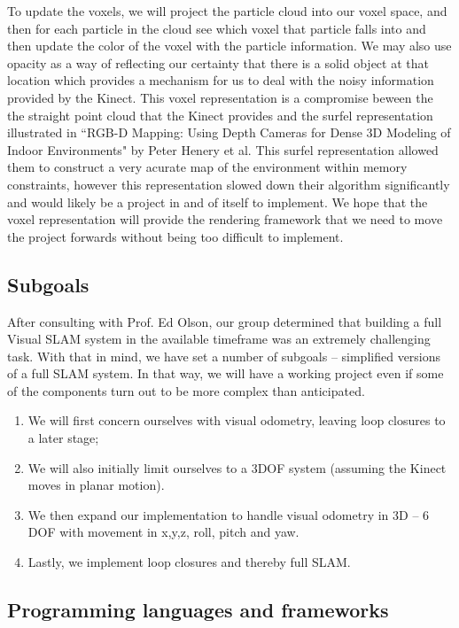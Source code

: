 \documentclass[12pt]{article}
\begin{document}
To update the voxels, we will project the particle cloud into our voxel space, and then for each particle in the cloud see which voxel that particle falls into and then update the color of the voxel with the particle information.  We may also use opacity as a way of reflecting our certainty that there is a solid object at that location which provides a mechanism for us to deal with the noisy information provided by the Kinect.  This voxel representation is a compromise beween the the straight point cloud that the Kinect provides and the surfel representation illustrated in ``RGB-D Mapping: Using Depth Cameras for Dense 3D Modeling of Indoor Environments" by Peter Henery et al. This surfel representation allowed them to construct a very acurate map of the environment within memory constraints, however this representation slowed down their algorithm significantly and would likely be a project in and of itself to implement.  We hope that the voxel representation will provide the rendering framework that we need to move the project forwards without being too difficult to implement.

\subsection{Subgoals}

After consulting with Prof. Ed Olson, our group determined that building a full Visual SLAM system in the available timeframe was an extremely challenging task.
With that in mind, we have set a number of subgoals -- simplified versions of a full SLAM system. In that way, we will have a working project even if
some of the components turn out to be more complex than anticipated.

\begin{enumerate}
\item We will first concern ourselves with visual odometry, leaving loop closures to a later stage;
\item We will also initially limit ourselves to a 3DOF system (assuming the Kinect moves in planar motion).
\item We then expand our implementation to handle visual odometry in 3D -- 6 DOF with movement in x,y,z, roll, pitch and yaw.
\item Lastly, we implement loop closures and thereby full SLAM. 
\end{enumerate}

\subsection{Programming languages and frameworks}
\end{document}
